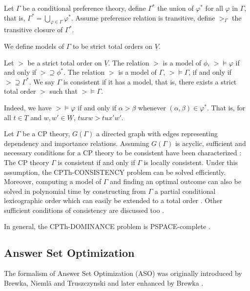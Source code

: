 \begin{definition}
	Let $\Gamma$ be a conditional preference theory, define $\Gamma^*$
	the union of $\varphi^*$ for all $\varphi$ in $\Gamma$, that is,
	$\Gamma^* = \bigcup_{\varphi \in \Gamma} \varphi^*$.
	Assume preference relation is transitive, define $>_{\Gamma}$
	the transitive closure of $\Gamma^*$.
\end{definition}

We define models of $\Gamma$ to be strict total orders on $\underline{V}$.
\begin{definition}
	Let $>$ be a strict total order on $\underline{V}$.
	The relation $>$ is a model of $\phi$, $> \models \varphi$ if and only if
	$> \supseteq \phi^*$.  
	The relation $>$ is a model of $\Gamma$, $> \models \Gamma$, if and only if 
	$> \supseteq \Gamma^*$.
	We say $\Gamma$ is consistent if it has a model, that is, 
	there exists a strict total order $>$
	such that $> \models \Gamma$.
\end{definition}

Indeed, we have $> \models \varphi$ if and only if $\alpha > \beta$ whenever
$(\alpha,\beta) \in \varphi^*$.  That is, for all $t \in \underline{T}$ and
$w,w' \in \underline{W}$, $tuxw > tux'w'$.


Let $\Gamma$ be a CP theory, $G(\Gamma)$ a directed graph with edges
representing dependency and importance relations.
Assuming $G(\Gamma)$ is acyclic,
sufficient and necessary conditions for a CP theory to be consistent
have been characterized \cite{Wilson04extendingcp-nets}:
The CP theory $\Gamma$ is consistent if and only if
$\Gamma$ is locally consistent.
Under this assumption, the CPTh-CONSISTENCY problem can be solved
efficiently.  Moreover, computing a model of $\Gamma$ and 
finding an optimal outcome can also be solved in polynomial time
by constructing from $\Gamma$ a partial conditional lexicographic order
which can easily be extended to a total order
\cite{Wilson04extendingcp-nets}.
Other sufficient conditions of consistency are discussed too
\cite{WilsonECAI04}.

In general, the CPTh-DOMINANCE problem is PSPACE-complete
\cite{Wilson:2006:EUA:1567016.1567119}.


\subsection{Answer Set Optimization}
The formalism of Answer Set Optimization (ASO) was originally introduced by
Brewka, Nieml\"a and Truszczynski \cite{Brewka03answerset} and
later enhanced by Brewka \cite{Brewka04}.

